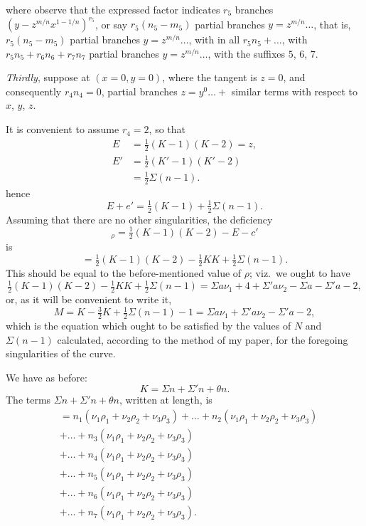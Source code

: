\documentclass[11pt,a4paper]{book}
\begin{document}
\newpage
where observe that the expressed factor indicates $r_5$ branches $\left(y-z^{m/n}x^{1-1/n}\right)^{r_5}$, or say $r_5(n_5-m_5)$ partial branches $y=z^{m/n}\dots$, that is, $r_5(n_5-m_5)$ partial branches $y=z^{m/n}\dots$, with in all $r_5n_5+\dots$, with $r_5n_5+r_6n_6+r_7n_7$ partial branches $y=z^{m/n}\dots$, with the suffixes $5$, $6$, $7$.

\textit{Thirdly}, suppose at $(x=0, y=0)$, where the tangent is $z=0$, and consequently $r_4n_4=0$, partial branches $z=y^0\dots+$ similar terms with respect to $x$, $y$, $z$.

It is convenient to assume $r_4=2$, so that
\begin{align*}
E&=\tfrac{1}{2}(K-1)(K-2)=z,\\
E'&=\tfrac{1}{2}(K'-1)(K'-2)\\
&=\tfrac{1}{2}\Sigma(n-1).
\end{align*}
hence
\[
E+e'=\tfrac{1}{2}(K-1)+\tfrac{1}{2}\Sigma(n-1).
\]
Assuming that there are no other singularities, the deficiency
\[
{}_\rho=\tfrac{1}{2}(K-1)(K-2)-E-c'
\]
is
\[
=\tfrac{1}{2}(K-1)(K-2)-\tfrac{1}{2}KK+\tfrac{1}{2}\Sigma(n-1).
\]
This should be equal to the before-mentioned value of $\rho$; viz.\ we ought to have
\[
\tfrac{1}{2}(K-1)(K-2)-\tfrac{1}{2}KK+\tfrac{1}{2}\Sigma(n-1)=\Sigma a\nu_1+4+\Sigma'a\nu_2-\Sigma a-\Sigma'a-2,
\]
or, as it will be convenient to write it,
\[
M=K-\tfrac{3}{2}K+\tfrac{1}{2}\Sigma(n-1)-1=\Sigma a\nu_1+\Sigma'a\nu_2-\Sigma'a-2,
\]
which is the equation which ought to be satisfied by the values of $N$ and $\Sigma (n-1)$ calculated, according to the method of my paper, for the foregoing singularities of the curve.

We have as before:
\[
K=\Sigma n+\Sigma'n+\theta n.
\]
The terms $\Sigma n+\Sigma'n+\theta n$, written at length, is
{\small
\begin{align*}
&=n_1(\nu_1\rho_1+\nu_2\rho_2+\nu_3\rho_3)+\dots+n_2(\nu_1\rho_1+\nu_2\rho_2+\nu_3\rho_3)\\
&+\dots+n_3(\nu_1\rho_1+\nu_2\rho_2+\nu_3\rho_3)\\
&+\dots+n_4(\nu_1\rho_1+\nu_2\rho_2+\nu_3\rho_3)\\
&+\dots+n_5(\nu_1\rho_1+\nu_2\rho_2+\nu_3\rho_3)\\
&+\dots+n_6(\nu_1\rho_1+\nu_2\rho_2+\nu_3\rho_3)\\
&+\dots+n_7(\nu_1\rho_1+\nu_2\rho_2+\nu_3\rho_3).
\end{align*}}
\end{document}
